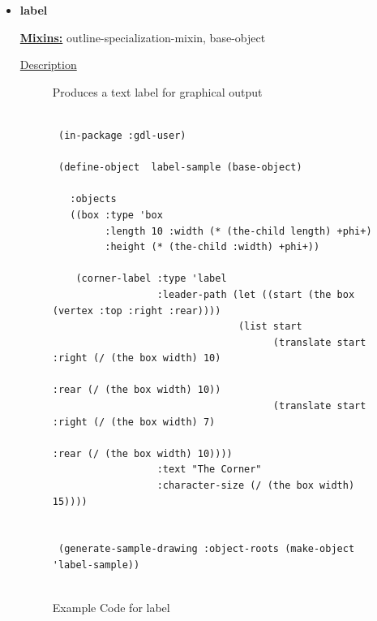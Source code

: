 \documentclass [11pt]{book}
\begin{document}
\begin{itemize}
\item {}
\label{prim:label}
\textbf{label}


\textbf{
\underline{Mixins:}} outline-specialization-mixin, base-object





\begin{description}

\item [
\underline{Description}]


Produces a text label for graphical output



\end{description}




\begin{figure}
\begin{lrbox}{\boxedverb}
\begin{minipage}{\linewidth}
{\small

\begin{verbatim}        

 (in-package :gdl-user)
                   
 (define-object  label-sample (base-object)
  
   :objects
   ((box :type 'box
         :length 10 :width (* (the-child length) +phi+)
         :height (* (the-child :width) +phi+))
   
    (corner-label :type 'label
                  :leader-path (let ((start (the box (vertex :top :right :rear))))
                                (list start
                                      (translate start :right (/ (the box width) 10)
                                                       :rear (/ (the box width) 10))
                                      (translate start :right (/ (the box width) 7)
                                                       :rear (/ (the box width) 10))))
                  :text "The Corner"
                  :character-size (/ (the box width) 15))))


 (generate-sample-drawing :object-roots (make-object 'label-sample))


\end{verbatim}}
\end{minipage}
\end{lrbox}
\fbox{\usebox{\boxedverb}}

\caption{Example Code for label}

\label{fig:example-code-label}


\end{figure}
\end{itemize}
\end{document}
